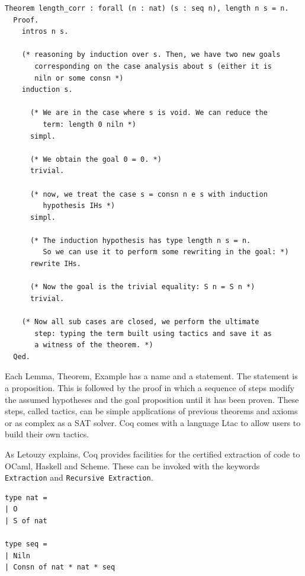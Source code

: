 \documentclass[12pt,twoside,notitlepage]{report}
\theoremstyle{plain}%
\theoremstyle{definition}
\theoremstyle{remark}
\begin{document}
\begin{minipage}{\linewidth}

\begin{lstlisting}[language={Coq},caption={Coq theorem example}]
Theorem length_corr : forall (n : nat) (s : seq n), length n s = n.
  Proof.
    intros n s.

    (* reasoning by induction over s. Then, we have two new goals
       corresponding on the case analysis about s (either it is 
       niln or some consn *)
    induction s.

      (* We are in the case where s is void. We can reduce the 
         term: length 0 niln *)
      simpl. 

      (* We obtain the goal 0 = 0. *)
      trivial.

      (* now, we treat the case s = consn n e s with induction 
         hypothesis IHs *)
      simpl. 

      (* The induction hypothesis has type length n s = n. 
         So we can use it to perform some rewriting in the goal: *)
      rewrite IHs. 

      (* Now the goal is the trivial equality: S n = S n *)
      trivial.

    (* Now all sub cases are closed, we perform the ultimate
       step: typing the term built using tactics and save it as
       a witness of the theorem. *)
  Qed.	  
\end{lstlisting}

\end{minipage}
Each Lemma, Theorem, Example has a name and a statement. The statement is a proposition. This is followed by the proof in which a sequence of steps modify the assumed hypotheses and the goal proposition until it has been proven. These steps, called tactics, can be simple applications of previous theorems and axioms or as complex as a SAT solver. Coq comes with a language Ltac to allow users to build their own tactics.


As Letouzy\cite{letouzey2008extraction} explains, Coq provides facilities for the certified extraction of code to OCaml, Haskell and Scheme. These can be invoked with the keywords \lstinline[language={Coq}]|Extraction| and \lstinline[language={Coq}]|Recursive Extraction|. 
\vspace{3mm}

\begin{minipage}{\linewidth}

\begin{lstlisting}[caption={Coq to OCaml extraction of seq}]
type nat =
| O
| S of nat

type seq =
| Niln
| Consn of nat * nat * seq
\end{lstlisting}

\end{minipage}
\end{document}
